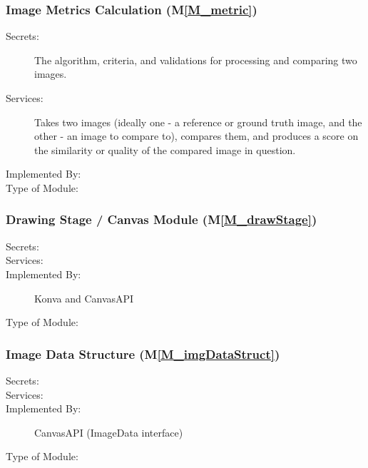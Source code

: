 \documentclass[12pt, titlepage]{article}
\newcommand{\mref}[1]{M\ref{#1}}
\begin{document}
\subsubsection{Image Metrics Calculation (\mref{M_metric})}
\begin{description}
\item[Secrets:]The algorithm, criteria, and validations for processing and comparing two images.
\item[Services:]Takes two images (ideally one - a reference or ground truth image, 
and the other - an image to compare to), compares them, and produces a score on the 
similarity or quality of the compared image in question.
\item[Implemented By:] \progname{}
\item[Type of Module:] 
\end{description}


\subsubsection{Drawing Stage / Canvas Module (\mref{M_drawStage})}
\begin{description}
\item[Secrets:] 
\item[Services:] 
\item[Implemented By:] Konva and CanvasAPI
\item[Type of Module:] 
\end{description}


\subsubsection{Image Data Structure (\mref{M_imgDataStruct})}
\begin{description}
\item[Secrets:]
\item[Services:]
\item[Implemented By:] CanvasAPI (ImageData interface)
\item[Type of Module:] 
\end{description}
\end{document}
